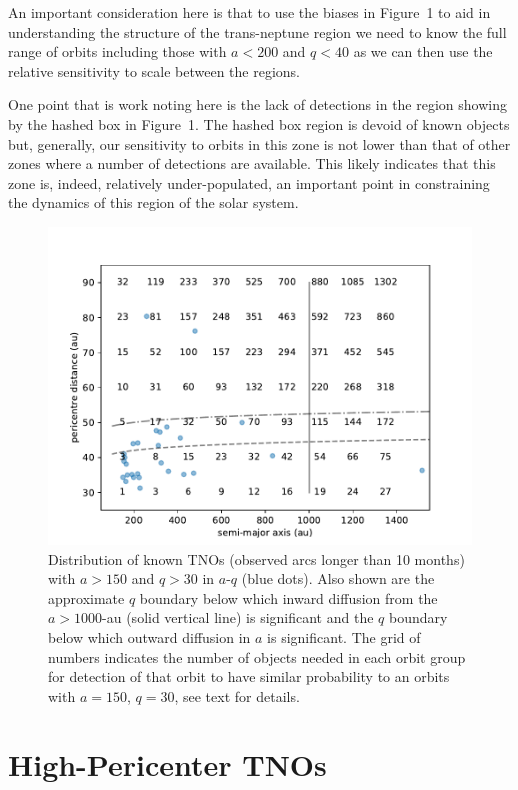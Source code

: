 \documentclass{aastex62}
\begin{document}
An important consideration here is that to use the biases in Figure~1 to aid in understanding the structure of the trans-neptune region we need to know the full range of orbits including those with $a< 200$ and $q<40$ as we can then use the relative sensitivity to scale between the regions. 

One point that is work noting here is the lack of detections in the region showing by the hashed box in Figure~1.  The hashed box region is devoid of known objects but, generally, our sensitivity to orbits in this zone is not lower than that of other zones where a number of detections are available.  This likely indicates that this zone is, indeed, relatively under-populated, an important point in constraining the dynamics of this region of the solar system.

\begin{figure}
\centering
\includegraphics[width=\textwidth]{figure1.pdf}
\caption{Distribution of known TNOs (observed arcs longer than 10 months) with $a > 150$ and $q > 30$ in $a$-$q$ (blue dots).  Also shown are the approximate $q$ boundary below which inward diffusion from the $a > 1000$-au (solid vertical line)  is significant and the $q$ boundary below which outward diffusion in $a$ is significant. The grid of numbers indicates the number of objects needed in each orbit group for detection of that orbit to have similar probability to an orbits with $a = 150$, $q = 30$, see text for details.}
\label{fig:bias}
\end{figure}

\section{High-Pericenter TNOs} \label{sec:highq}
\end{document}
